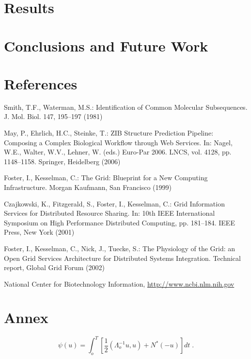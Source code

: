 \documentclass[runningheads,a4paper]{llncs}
\begin{document}
\section{Results}


\section{Conclusions and Future Work}


\section{References}

\begin{thebibliography}{4}

 Smith, T.F., Waterman, M.S.: Identification of Common Molecular
Subsequences. J. Mol. Biol. 147, 195--197 (1981)

 May, P., Ehrlich, H.C., Steinke, T.: ZIB Structure Prediction Pipeline:
Composing a Complex Biological Workflow through Web Services. In: Nagel,
W.E., Walter, W.V., Lehner, W. (eds.) Euro-Par 2006. LNCS, vol. 4128,
pp. 1148--1158. Springer, Heidelberg (2006)

 Foster, I., Kesselman, C.: The Grid: Blueprint for a New Computing
Infrastructure. Morgan Kaufmann, San Francisco (1999)

 Czajkowski, K., Fitzgerald, S., Foster, I., Kesselman, C.: Grid
Information Services for Distributed Resource Sharing. In: 10th IEEE
International Symposium on High Performance Distributed Computing, pp.
181--184. IEEE Press, New York (2001)

 Foster, I., Kesselman, C., Nick, J., Tuecke, S.: The Physiology of the
Grid: an Open Grid Services Architecture for Distributed Systems
Integration. Technical report, Global Grid Forum (2002)

 National Center for Biotechnology Information, \url{http://www.ncbi.nlm.nih.gov}

\end{thebibliography}


\section{Annex}

\begin{equation}
  \psi (u) = \int_{o}^{T} \left[\frac{1}{2}
  \left(\Lambda_{o}^{-1} u,u\right) + N^{\ast} (-u)\right] dt \;  .
\end{equation}
\end{document}
